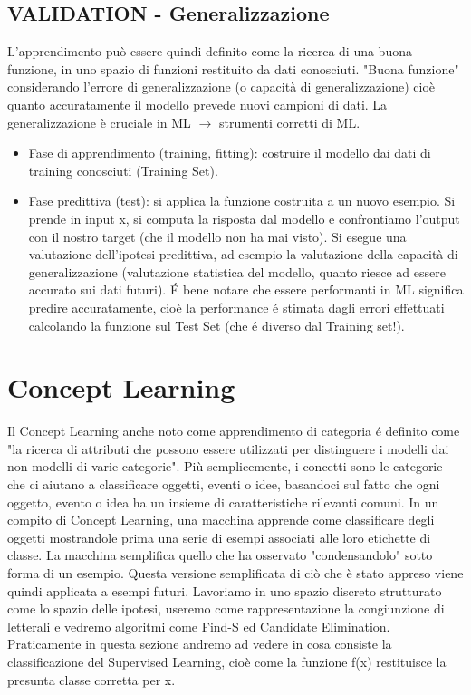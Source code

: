 \documentclass{article}
\begin{document}
\subsection{VALIDATION - Generalizzazione}
L'apprendimento può essere quindi definito come la ricerca di una buona funzione, in uno spazio di funzioni restituito da dati conosciuti. "Buona funzione" considerando l'errore di generalizzazione (o capacità di generalizzazione) cioè quanto accuratamente il modello prevede nuovi campioni di dati. La generalizzazione è cruciale in ML $\rightarrow$ strumenti corretti di ML.
\begin{itemize}
    \item Fase di apprendimento (training, fitting): costruire il modello dai dati di training conosciuti (Training Set).
    \item Fase predittiva (test): si applica la funzione costruita a un nuovo esempio. Si prende in input x, si computa la risposta dal modello e confrontiamo l'output con il nostro target (che il modello non ha mai visto). Si esegue una valutazione dell'ipotesi predittiva, ad esempio la valutazione della capacità di generalizzazione (valutazione statistica del modello, quanto riesce ad essere accurato sui dati futuri). É bene notare che essere performanti in ML significa predire accuratamente, cioè la performance é stimata dagli errori effettuati calcolando la funzione sul Test Set (che é diverso dal Training set!).
\end{itemize}

\section{Concept Learning}
Il Concept Learning anche noto come apprendimento di categoria é definito come "la ricerca di attributi che possono essere utilizzati per distinguere i modelli dai non modelli di varie categorie". Più semplicemente, i concetti sono le categorie che ci aiutano a classificare oggetti, eventi o idee, basandoci sul fatto che ogni oggetto, evento o idea ha un insieme di caratteristiche rilevanti comuni. In un compito di Concept Learning, una macchina apprende come classificare degli oggetti mostrandole prima una serie di esempi associati alle loro etichette di classe. La macchina semplifica quello che ha osservato "condensandolo" sotto forma di un esempio. Questa versione semplificata di ciò che è stato appreso viene quindi applicata a esempi futuri. \newline
Lavoriamo in uno spazio discreto strutturato come lo spazio delle ipotesi, useremo come rappresentazione la congiunzione di letterali e vedremo algoritmi come Find-S ed Candidate Elimination. Praticamente in questa sezione andremo ad vedere in cosa consiste la classificazione del Supervised Learning, cioè come la funzione f(x) restituisce la presunta classe corretta per x.
\end{document}

